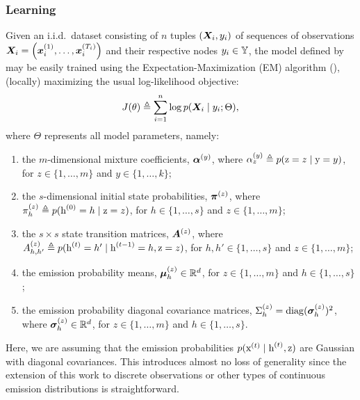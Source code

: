 \subsubsection{Learning}
\label{sec:spamhmm_learning}
Given an i.i.d.\ dataset consisting of $n$ tuples $({\bm{X}}_i, y_i)$ of sequences of observations ${\bm{X}}_i = \left({\bm{x}}_i^{(1)}, \dots,{\bm{x}}_i^{(T_i)} \right)$ and their respective nodes $y_i \in {\mathbb{Y}}$, the model defined by  may be easily trained using the Expectation-Maximization (EM) algorithm (\citet{Dempster1977}), (locally) maximizing the usual log-likelihood objective:
\begin{equation}
\label{eq:spamhmm_log_likelihood}
J(\theta) \triangleq \sum_{i=1}^n \log p({\bm{X}}_i \mid y_i; \Theta),
\end{equation}
where $\Theta$ represents all model parameters, namely:
\begin{enumerate}
	\item the $m$-dimensional mixture coefficients, ${\bm{\alpha}}^{(y)}$, where $ {\alpha}^{(y)}_z \triangleq p({\textnormal{z}}=z \mid {\textnormal{y}}=y)$, for $z \in \{1,\dots,m\}$ and $y \in \{ 1,\dots,k \}$;
	\item the $s$-dimensional initial state probabilities, ${\bm{\pi}}^{(z)}$, where ${\pi}_h^{(z)} \triangleq p({\textnormal{h}}^{(0)}=h \mid {\textnormal{z}}=z)$, for $h \in \{1,\dots,s\}$ and $z \in \{1,\dots,m\}$;
	\item the $s \times s$ state transition matrices, ${\bm{A}}^{(z)}$, where ${A}^{(z)}_{h,h'} \triangleq p({\textnormal{h}}^{(t)}=h' \mid {\textnormal{h}}^{(t-1)}=h, {\textnormal{z}}=z)$, for $h,h' \in \{1,\dots,s\}$ and $z \in \{1,\dots,m\}$;
	\item the emission probability means, ${\bm{\mu}}^{(z)}_h \in \mathbb{R}^d$, for $z \in \{1,\dots,m\}$ and $h \in \{1,\dots,s\}$;
	\item the emission probability diagonal covariance matrices, $\Sigma^{(z)}_h = \mathrm{diag}({\bm{\sigma}}^{(z)}_h)^2$, where ${\bm{\sigma}}^{(z)}_h \in \mathbb{R}^d$, for $z \in \{1,\dots,m\}$ and $h \in \{1,\dots,s\}$.
\end{enumerate}

Here, we are assuming that the emission probabilities $p({\textnormal{x}}^{(t)}\mid{\textnormal{h}}^{(t)},{\textnormal{z}})$ are Gaussian with diagonal covariances. This introduces almost no loss of generality since the extension of this work to discrete observations or other types of continuous emission distributions is straightforward.

